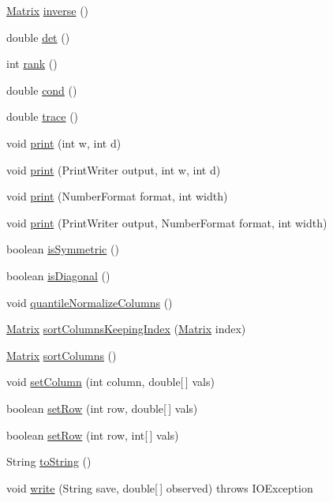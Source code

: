 \begin{DoxyCompactItemize}
\item 
\hyperlink{class_jama_1_1_matrix}{Matrix} \hyperlink{class_jama_1_1_matrix_a51ae1c3a1dc5f2b9530757782e6e8a3b}{inverse} ()
\item 
double \hyperlink{class_jama_1_1_matrix_a73763058e74bca2ec54b16f5fa742b53}{det} ()
\item 
int \hyperlink{class_jama_1_1_matrix_a9077405bb7b92c856e4372cd42abc020}{rank} ()
\item 
double \hyperlink{class_jama_1_1_matrix_a531ae0d584b7861c5924efcc9d356741}{cond} ()
\item 
double \hyperlink{class_jama_1_1_matrix_a3ab61e6f9bd76233aa3520fccf3c7ed1}{trace} ()
\item 
void \hyperlink{class_jama_1_1_matrix_a4626967ae6a8fb4773f98a53a3a2f2a9}{print} (int w, int d)
\item 
void \hyperlink{class_jama_1_1_matrix_a30ed3c813df670d2baf376dc449c7519}{print} (Print\+Writer output, int w, int d)
\item 
void \hyperlink{class_jama_1_1_matrix_ae9242a19fa753bbe65d18feacc7a2485}{print} (Number\+Format format, int width)
\item 
void \hyperlink{class_jama_1_1_matrix_a6b9fef16419bcb7af05f1513f78938f4}{print} (Print\+Writer output, Number\+Format format, int width)
\item 
boolean \hyperlink{class_jama_1_1_matrix_a081f88a952b4efe65ca8ab758f6893fb}{is\+Symmetric} ()
\item 
boolean \hyperlink{class_jama_1_1_matrix_a1e03a02fb132e843e6ec9b08c9674fdd}{is\+Diagonal} ()
\item 
void \hyperlink{class_jama_1_1_matrix_a19550f24e4ea8ec323879e525d7f3f18}{quantile\+Normalize\+Columns} ()
\item 
\hyperlink{class_jama_1_1_matrix}{Matrix} \hyperlink{class_jama_1_1_matrix_a9badd0bece3e57cab71286103370d79e}{sort\+Columns\+Keeping\+Index} (\hyperlink{class_jama_1_1_matrix}{Matrix} index)
\item 
\hyperlink{class_jama_1_1_matrix}{Matrix} \hyperlink{class_jama_1_1_matrix_aefddb41d4a3265377a6e2c2aa8813d15}{sort\+Columns} ()
\item 
void \hyperlink{class_jama_1_1_matrix_a9d5823758d0a73cd1e729915d32db5ec}{set\+Column} (int column, double\mbox{[}$\,$\mbox{]} vals)
\item 
boolean \hyperlink{class_jama_1_1_matrix_a4c38cfb681b2d2a64c29467b2a08c045}{set\+Row} (int row, double\mbox{[}$\,$\mbox{]} vals)
\item 
boolean \hyperlink{class_jama_1_1_matrix_a30d87c7b754b5b871df11b88da50f870}{set\+Row} (int row, int\mbox{[}$\,$\mbox{]} vals)
\item 
String \hyperlink{class_jama_1_1_matrix_a61d6f187a44bdd9fd3426c12e993c49a}{to\+String} ()
\item 
void \hyperlink{class_jama_1_1_matrix_a54059fe342218e3bffd363cd11fc1855}{write} (String save, double\mbox{[}$\,$\mbox{]} observed)  throws I\+O\+Exception 
\end{DoxyCompactItemize}
